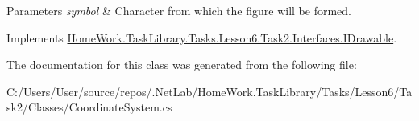 \begin{DoxyParams}{Parameters}
{\em symbol} & Character from which the figure will be formed.\\
\hline
\end{DoxyParams}


Implements \mbox{\hyperlink{interface_home_work_1_1_task_library_1_1_tasks_1_1_lesson6_1_1_task2_1_1_interfaces_1_1_i_drawable_abf1b3858b298548d8562a5e2229ac564}{Home\+Work.\+Task\+Library.\+Tasks.\+Lesson6.\+Task2.\+Interfaces.\+I\+Drawable}}.



The documentation for this class was generated from the following file\+:\begin{DoxyCompactItemize}
\item 
C\+:/\+Users/\+User/source/repos/.\+Net\+Lab/\+Home\+Work.\+Task\+Library/\+Tasks/\+Lesson6/\+Task2/\+Classes/Coordinate\+System.\+cs\end{DoxyCompactItemize}
